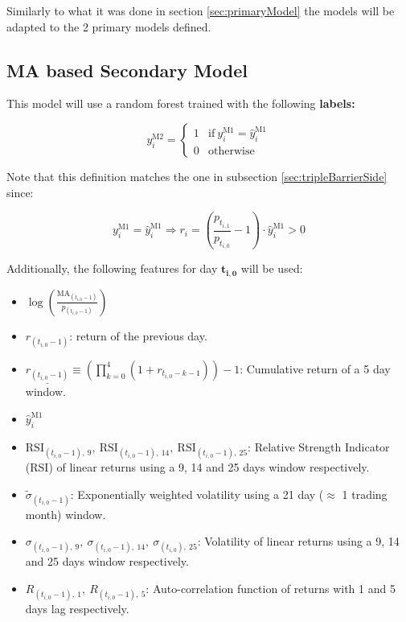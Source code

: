 \documentclass[a4paper]{article}
\begin{document}
Similarly to what it was done in section \ref{sec:primaryModel} the 
models will be adapted to the 2 primary models defined.

\subsection{MA based Secondary Model}
\label{sec:MASecondaryModel}
This model will use a random forest trained with the following
\textbf{labels:}

\begin{equation*}
	y^{\text{M2}}_i =
	\begin{cases}
	1 & \text{if}\ y^{\text{M1}}_i = \hat{y}^{\text{M1}}_i\\
	0 & \text{otherwise}
	\end{cases}
\end{equation*}

Note that this definition matches the one in subsection 
\ref{sec:tripleBarrierSide} since:

\begin{equation*}
	y^{\text{M1}}_i = \hat{y}^{\text{M1}}_i \Rightarrow 
	r_i	= \left( \frac{p_{t_{i,1}}}{p_{t_{i,0}}} - 1 \right) \cdot 
	\hat{y}^{\text{M1}}_i > 0
\end{equation*}

Additionally, the following features for day $\boldsymbol{t_{i,0}}$ 
will be used:

\begin{itemize}	
	\item $\log \left( \frac{\text{MA}_{(t_{i,0}-1)}}{p_{(t_{i,0}-1)}} 
	\right)$
	
	\item $r_{(t_{i,0}-1)}$: return of the previous day.
	
	\item $\underline{r_{(t_{i,0}-1)}} \equiv \left( 
	\prod_{k=0}^{4} (1 + r_{t_{i,0}-k-1}) 
	\right) - 1$: Cumulative return of a 5 day window.
	
	\item $\hat{y}_{i}^{\text{M1}}$

	\item $\text{RSI}_{(t_{i,0}-1),\ 9},\ 
	\text{RSI}_{(t_{i,0}-1),\ 14},\ 
	\text{RSI}_{(t_{i,0}-1),\ 25}$:
	Relative Strength Indicator (RSI) of linear returns using a 9, 14 
	and 25 days window respectively.
	
	\item $\tilde{\sigma}_{(t_{i,0}-1)}$: Exponentially weighted 
	volatility using a 21 day ($\approx$ 1 trading month) window.
	
	\item $\sigma_{(t_{i,0}-1),\ 9},\ \sigma_{(t_{i,0}-1),\ 14},\ 
	\sigma_{(t_{i,0}),\ 25}$: Volatility of linear returns using a 9, 
	14 and 25 days window respectively.
	
	\item $R_{(t_{i,0}-1),\ 1},\ R_{(t_{i,0}-1),\ 5}$: 
	Auto-correlation function of returns with 1 and 5 days lag 
	respectively.
\end{itemize}
\end{document}
